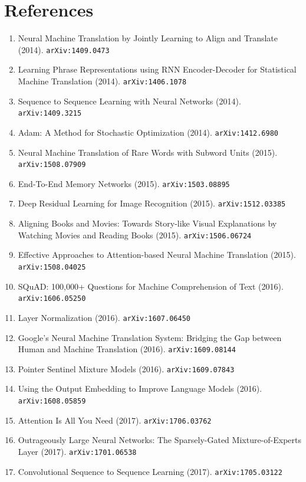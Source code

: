 \documentclass[11pt]{article}
\begin{document}
\section*{References}
\begin{enumerate}\small
  \item Neural Machine Translation by Jointly Learning to Align and Translate (2014). \texttt{arXiv:1409.0473}
  \item Learning Phrase Representations using RNN Encoder-Decoder for
  Statistical Machine Translation (2014). \texttt{arXiv:1406.1078}
  \item Sequence to Sequence Learning with Neural Networks (2014). \texttt{arXiv:1409.3215}
  \item Adam: A Method for Stochastic Optimization (2014). \texttt{arXiv:1412.6980}
  \item Neural Machine Translation of Rare Words with Subword Units (2015). \texttt{arXiv:1508.07909}
  \item End-To-End Memory Networks (2015). \texttt{arXiv:1503.08895}
  \item Deep Residual Learning for Image Recognition (2015). \texttt{arXiv:1512.03385}
  \item Aligning Books and Movies: Towards Story-like Visual Explanations by
  Watching Movies and Reading Books (2015). \texttt{arXiv:1506.06724}
  \item Effective Approaches to Attention-based Neural Machine Translation (2015). \texttt{arXiv:1508.04025}
  \item SQuAD: 100,000+ Questions for Machine Comprehension of Text (2016). \texttt{arXiv:1606.05250}
  \item Layer Normalization (2016). \texttt{arXiv:1607.06450}
  \item Google's Neural Machine Translation System: Bridging the Gap between
  Human and Machine Translation (2016). \texttt{arXiv:1609.08144}
  \item Pointer Sentinel Mixture Models (2016). \texttt{arXiv:1609.07843}
  \item Using the Output Embedding to Improve Language Models (2016). \texttt{arXiv:1608.05859}
  \item Attention Is All You Need (2017). \texttt{arXiv:1706.03762}
  \item Outrageously Large Neural Networks: The Sparsely-Gated
  Mixture-of-Experts Layer (2017). \texttt{arXiv:1701.06538}
  \item Convolutional Sequence to Sequence Learning (2017). \texttt{arXiv:1705.03122}

\end{enumerate}
\end{document}

